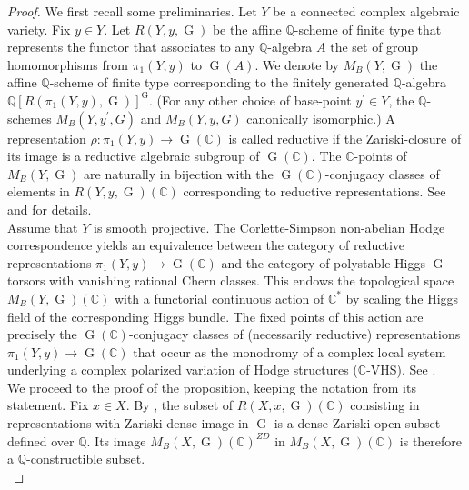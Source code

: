 \documentclass[11pt,letterpaper]{amsart}
\def\bQ{\mathbb{Q}}
\def\bC{\mathbb{C}}
\theoremstyle{plain}
\DeclareMathOperator{\rG}{G}
\begin{document}
\begin{proof} 
We first recall some preliminaries. Let $Y$ be a connected complex algebraic variety. Fix $y \in Y$. Let $R(Y,y, \rG)$ be the affine $\bQ$-scheme of finite type that represents the functor that associates to any $\bQ$-algebra $A$ the set of group homomorphisms from $\pi_1(Y,y)$ to $\rG(A)$. We denote by $M_B(Y, \rG)$ the affine $\bQ$-scheme of finite type corresponding to the finitely generated $\bQ$-algebra $\bQ[R(\pi_1(Y,y), \rG)]^{\rG}$. (For any other choice of base-point $y^\prime \in Y$, the $\bQ$-schemes $M_B(Y,y^\prime,G)$ and $M_B(Y,y,G)$ canonically isomorphic.) A representation $\rho \colon \pi_1(Y,y) \to \rG(\bC)$ is called reductive if the Zariski-closure of its image is a reductive algebraic subgroup of $\rG(\bC)$. The $\bC$-points of $M_B(Y, \rG)$ are naturally in bijection with the $\rG(\bC)$-conjugacy classes of elements in $R(Y,y, \rG)(\bC)$ corresponding to reductive representations. See \cite{Lubotzky-Magid} and \cite{Sikora} for details.\\

Assume that $Y$ is smooth projective. The Corlette-Simpson non-abelian Hodge correspondence yields an equivalence between the category of reductive representations $\pi_1(Y,y) \to \rG(\bC)$ and the category of polystable Higgs $\rG$-torsors with vanishing rational Chern classes. This endows the topological space $M_B(Y, \rG)(\bC)$ with a functorial continuous action of $\bC^\ast$ by scaling the Higgs field of the corresponding Higgs bundle. The fixed points of this action are precisely the $\rG(\bC)$-conjugacy classes of (necessarily reductive) representations $\pi_1(Y,y) \to \rG(\bC)$ that occur as the monodromy of a complex local system underlying a complex polarized variation of Hodge structures ($\bC$-VHS). See \cite{SimpsonHiggs}. \\

We proceed to the proof of the proposition, keeping the notation from its statement. Fix $x \in X$. By \cite[Proposition 8.2]{A'Campo-Burger}, the subset of $R(X,x, \rG)(\bC)$ consisting in representations with Zariski-dense image in $\rG$ is a dense Zariski-open subset defined over $\bQ$. Its image $M_B(X, \rG)(\bC)^{ZD}$ in $M_B(X, \rG)(\bC)$ is therefore a $\bQ$-constructible subset. \\


\end{proof}
\end{document}
